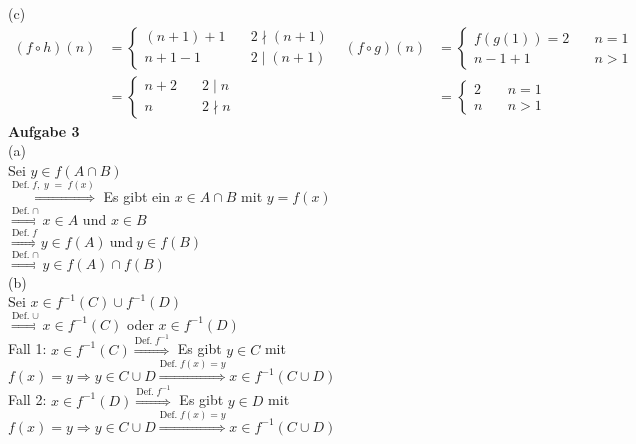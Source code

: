 \documentclass[a4paper, 12pt]{scrartcl}
\theoremstyle{plain}
\begin{document}
(c)
\begin{align*}
(f \circ h)(n) &= \begin{cases}(n+1)+1 &\quad 2  \nmid (n+1) \\ n+1-1 &\quad 2 \mid (n+1) \end{cases} & (f \circ g)(n) &= \begin{cases} f(g(1)) = 2 &\quad n = 1\\ n-1+1 &\quad n > 1\end{cases}\\
&= \begin{cases} n + 2 &\quad 2 \mid n\\n &\quad 2 \nmid n  \end{cases} & &= \begin{cases}2 &\quad n=1\\n &\quad n > 1\end{cases}
\end{align*}
\newpage
\textbf{Aufgabe 3}\\

\newcommand{\defimpl}[1]{\stackrel{\text{Def.}\;#1}{\Longrightarrow}}
(a)\\
Sei $y \in f(A \cap B)$\\
$\defimpl{f,\;y\;=\;f(x)}$ Es gibt ein $x \in A \cap B$ mit $y = f(x)$ \\	
$ \defimpl{\cap} x \in A$ und $x \in B$\\
$\stackrel{\text{Def.}\;f}{\Longrightarrow} y \in f(A)\ \text{und}\ y \in f(B)$\\
$ \defimpl{\cap} y \in f(A) \cap f(B)$ \\
(b)\\
Sei $x \in f^{-1}(C) \cup f^{-1}(D)$ \\
$\defimpl{\cup} x \in f^{-1}(C)$ oder $x \in f^{-1}(D)$ \\
Fall 1: $x \in f^{-1}(C) \defimpl{f^{-1}}$ Es gibt $y \in C$ mit $f(x) = y \Rightarrow y \in C \cup D \defimpl{f(x) = y} x \in f^{-1}(C \cup D)$ \\
Fall 2: $x \in f^{-1}(D) \defimpl{f^{-1}}$ Es gibt $y \in D$ mit $f(x) = y \Rightarrow y \in C \cup D \defimpl{f(x) = y} x \in f^{-1}(C \cup D)$
\end{document}
